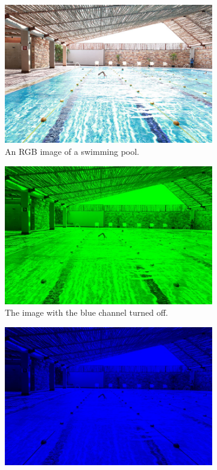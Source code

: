 \documentclass[addpoints]{exam}
\begin{document}
\begin{figure}
  \centering
  \begin{subfigure}{.3\textwidth}
    \includegraphics[width=\textwidth]{pool}
    \caption{An RGB image of a swimming pool.}
  \end{subfigure}
  \begin{subfigure}{.3\textwidth}
    \includegraphics[width=\textwidth]{pool-sans-blue}
    \caption{The image with the blue channel turned off.}
  \end{subfigure}
  \begin{subfigure}{.3\textwidth}
    \includegraphics[width=\textwidth]{pool-only-blue}

\end{subfigure}
\end{figure}
\end{document}
